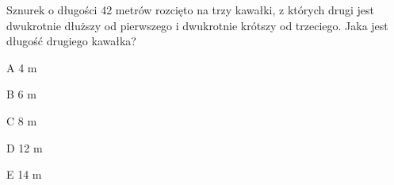 \begin{tresc}
Sznurek o długości 42 metrów rozcięto na trzy kawałki, z których drugi jest dwukrotnie dłuższy od pierwszego i dwukrotnie krótszy od trzeciego. Jaka jest długość drugiego kawałka?
\end{tresc}
\begin{wariant}{A} 4 m \end{wariant}
\begin{wariant}{B} 6 m \end{wariant}
\begin{wariant}{C} 8 m \end{wariant}
\begin{wariant}{D} 12 m \end{wariant}
\begin{wariant}{E} 14 m \end{wariant}

